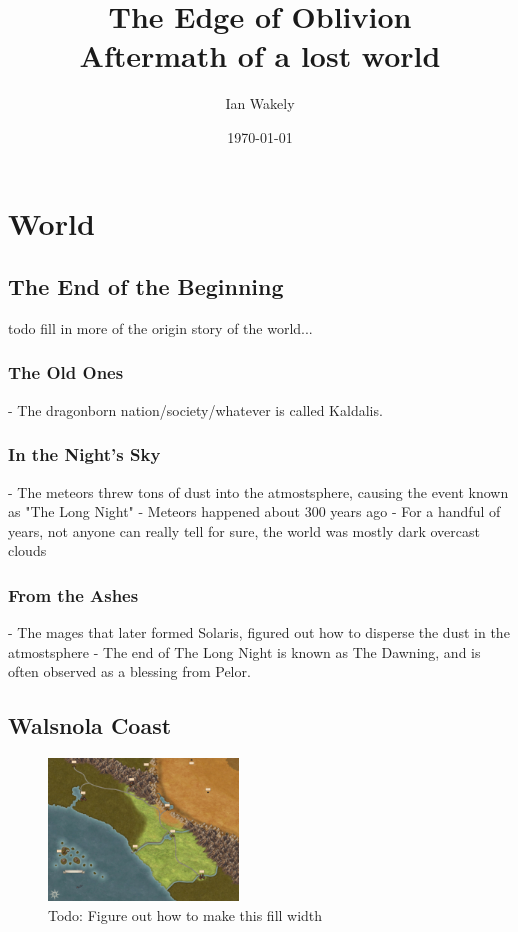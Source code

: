 \documentclass[letterpaper,twocolumn,openany,nodeprecatedcode]{dndbook}
\title{The Edge of Oblivion \\
\large Aftermath of a lost world}
\author{Ian Wakely}
\date{\today}
\begin{document}
\frontmatter

\maketitle

\tableofcontents

\mainmatter%

\part{World}

\chapter{The End of the Beginning}

todo fill in more of the origin story of the world...

\section{The Old Ones}

- The dragonborn nation/society/whatever is called Kaldalis.

\section{In the Night's Sky}

- The meteors threw tons of dust into the atmostsphere, causing the event known as "The Long Night"
- Meteors happened about 300 years ago
- For a handful of years, not anyone can really tell for sure, the world was mostly dark overcast clouds

\section{From the Ashes}

- The mages that later formed Solaris, figured out how to disperse the dust in the atmostsphere
- The end of The Long Night is known as The Dawning, and is often observed as a blessing from Pelor.

\chapter{Walsnola Coast}

\begin{figure}[h!]
  \centering
  \includegraphics[width=0.45\textwidth]{maps/coastline.jpg}
  \caption{Todo: Figure out how to make this fill width}
\end{figure}
\end{document}
